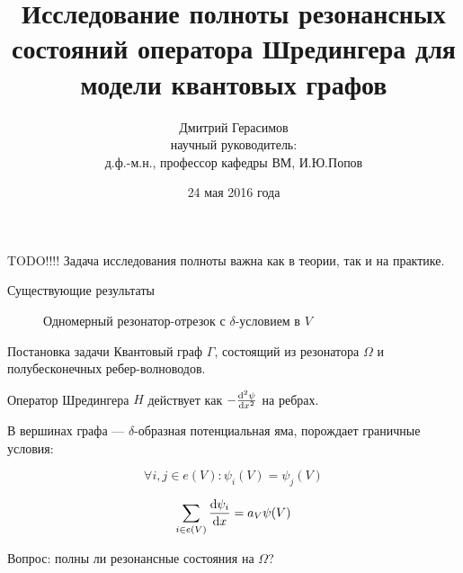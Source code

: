 \documentclass{beamer}
\title[]{Исследование полноты резонансных состояний оператора Шредингера
для модели квантовых графов}
\author[Дмитрий Герасимов]{Дмитрий Герасимов\\{\small научный руководитель: \\ д.ф.-м.н., профессор кафедры ВМ, И.Ю.Попов}}
\institute[ИТМО]{Университет ИТМО}
\date{24 мая 2016 года}
\begin{document}
\maketitle

\begin{frame}{TODO!!!!}
Задача исследования полноты важна как в теории, так и на практике.



\end{frame}



% 
% 
% 
% 
% 
% 
\begin{frame}{Существующие результаты}
\begin{figure}
\begin{tikzpicture}[scale=0.5]

\end{tikzpicture}
\caption{Одномерный резонатор-отрезок с $\delta$-условием в $V$}
\end{figure}


\end{frame}


\begin{frame}{Постановка задачи}
Квантовый граф $\Gamma$, состоящий из резонатора $\Omega$ и полубесконечных ребер-волноводов.

Оператор Шредингера $H$ действует как $-\dv[2]{\psi}{x}$ на ребрах.

В вершинах графа — $\delta$-образная потенциальная яма, порождает граничные условия:

\[
\forall i, j \in e(V): \psi_i(V) = \psi_j(V)
\]

\[
\sum\limits_{i \in e(V)} \dv{\psi_i}{x} (V) = a_V \psi(V)
\]

Вопрос: полны ли резонансные состояния на $\Omega$?
\end{frame}
\end{document}
